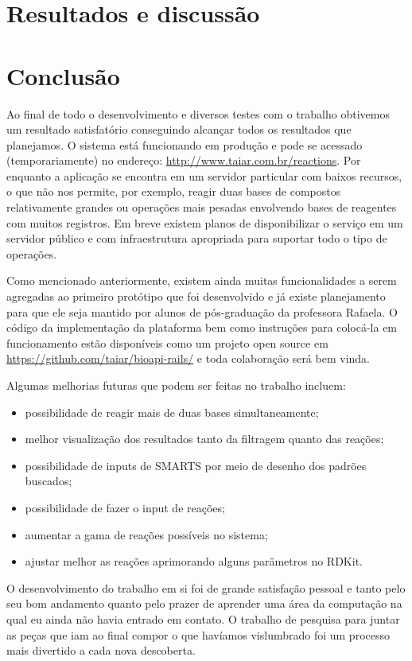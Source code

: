 \documentclass{abnt}
\begin{document}
\chapter{Resultados e discussão}

\chapter{Conclusão}

Ao final de todo o desenvolvimento e diversos testes com o trabalho obtivemos um
resultado satisfatório conseguindo alcançar todos os resultados que planejamos.
O sistema está funcionando em produção e pode se acessado (temporariamente) no
endereço: \url{http://www.taiar.com.br/reactions}. Por enquanto a aplicação se encontra
em um servidor particular com baixos recursos, o que não nos permite, por exemplo,
reagir duas bases de compostos relativamente grandes ou operações mais pesadas envolvendo
bases de reagentes com muitos registros. Em breve existem planos de disponibilizar
o serviço em um servidor público e com infraestrutura apropriada para suportar todo
o tipo de operações.

Como mencionado anteriormente, existem ainda muitas funcionalidades a serem agregadas
ao primeiro protótipo que foi desenvolvido e já existe planejamento para que ele
seja mantido por alunos de pós-graduação da professora Rafaela. O código da implementação
da plataforma bem como instruções para colocá-la em funcionamento estão disponíveis
como um projeto open source em \url{https://github.com/taiar/bioapi-rails/} e toda
colaboração será bem vinda.

Algumas melhorias futuras que podem ser feitas no trabalho incluem:

\begin{itemize}
  \item possibilidade de reagir mais de duas bases simultaneamente;
  \item melhor visualização dos resultados tanto da filtragem quanto das reações;
  \item possibilidade de inputs de SMARTS por meio de desenho dos padrões buscados;
  \item possibilidade de fazer o input de reações;
  \item aumentar a gama de reações possíveis no sistema;
  \item ajustar melhor as reações aprimorando alguns parâmetros no RDKit.
\end{itemize}

O desenvolvimento do trabalho em si foi de grande satisfação pessoal e tanto pelo
seu bom andamento quanto pelo prazer de aprender uma área da computação na qual
eu ainda não havia entrado em contato. O trabalho de pesquisa para juntar as peças
que iam ao final compor o que havíamos vislumbrado foi um processo mais divertido
a cada nova descoberta.


\end{document}
